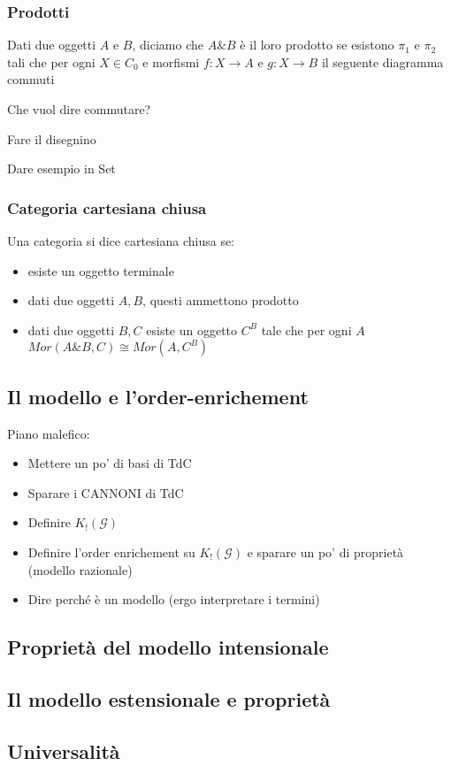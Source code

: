 \documentclass{beamer}
\begin{document}
\begin{frame}
	
	\frametitle{Prodotti}
	
	Dati due oggetti $A$ e $B$, diciamo che $A\& B$ è il loro prodotto se esistono $\pi_1$ e $\pi_2$ tali che per ogni $X\in C_0$ e morfismi $f: X \rightarrow A$ e $g: X \rightarrow B$ il seguente diagramma commuti
	
	Che vuol dire commutare?
	
	Fare il disegnino
	
	Dare esempio in Set
	
\end{frame}


\begin{frame}
	
	\frametitle{Categoria cartesiana chiusa}
	
	Una categoria si dice cartesiana chiusa se:
	\begin{itemize}
		\item esiste un oggetto terminale
		\item dati due oggetti $A,B$, questi ammettono prodotto
		\item dati due oggetti $B,C$ esiste un oggetto $C^B$ tale che per ogni $A$ $Mor(A\&B,C)\cong Mor(A,C^B)$
	\end{itemize}
	
\end{frame}












\subsection{Il modello e l'order-enrichement}

\begin{frame}
	Piano malefico:
	\begin{itemize}
	\item	Mettere un po' di basi di TdC
	\item Sparare i CANNONI di TdC
	\item Definire $K_! (\mathcal{G})$
	\item Definire l'order enrichement su $K_! (\mathcal{G})$ e sparare un po' di proprietà (modello razionale)
	\item Dire perché è un modello (ergo interpretare i termini)
	\end{itemize}
\end{frame}


\subsection{Proprietà del modello intensionale}
\subsection{Il modello estensionale e proprietà}
\subsection{Universalità}
\end{document}
